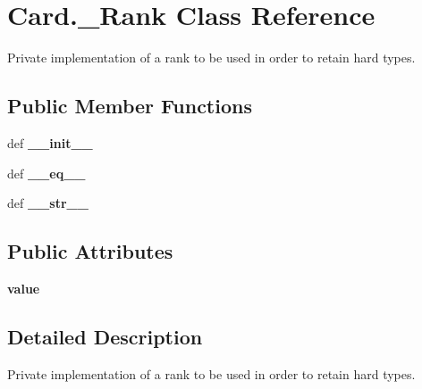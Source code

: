 \hypertarget{classCard_1_1__Rank}{\section{Card.\-\_\-\-Rank Class Reference}
\label{classCard_1_1__Rank}
}


Private implementation of a rank to be used in order to retain hard types.  


\subsection*{Public Member Functions}
\begin{DoxyCompactItemize}
\item 
\hypertarget{classCard_1_1__Rank_aea641f019097ae54fecb41113ce7af39}{def {\bfseries \-\_\-\-\_\-init\-\_\-\-\_\-}}\label{classCard_1_1__Rank_aea641f019097ae54fecb41113ce7af39}

\item 
\hypertarget{classCard_1_1__Rank_a9347a276cfa070173ac99e29057360dc}{def {\bfseries \-\_\-\-\_\-eq\-\_\-\-\_\-}}\label{classCard_1_1__Rank_a9347a276cfa070173ac99e29057360dc}

\item 
\hypertarget{classCard_1_1__Rank_ab208dd660d0c111022872f1a02de4706}{def {\bfseries \-\_\-\-\_\-str\-\_\-\-\_\-}}\label{classCard_1_1__Rank_ab208dd660d0c111022872f1a02de4706}

\end{DoxyCompactItemize}
\subsection*{Public Attributes}
\begin{DoxyCompactItemize}
\item 
\hypertarget{classCard_1_1__Rank_a747e083ba6c26ab61826734ee15744d1}{{\bfseries value}}\label{classCard_1_1__Rank_a747e083ba6c26ab61826734ee15744d1}

\end{DoxyCompactItemize}


\subsection{Detailed Description}
Private implementation of a rank to be used in order to retain hard types. 
